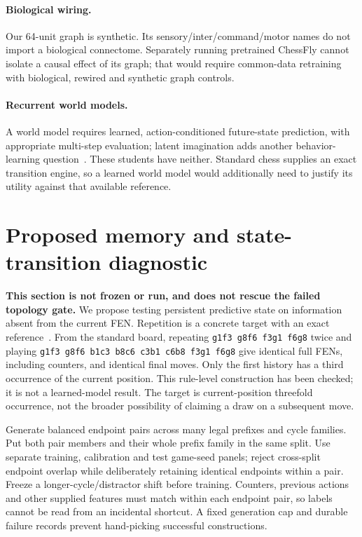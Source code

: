 \documentclass[10pt]{article}
\begin{document}
\paragraph{Biological wiring.}
Our 64-unit graph is synthetic. Its sensory/inter/command/motor names do not
import a biological connectome. Separately running pretrained ChessFly cannot
isolate a causal effect of its graph; that would require common-data retraining
with biological, rewired and synthetic graph controls.
\paragraph{Recurrent world models.}
A world model requires learned, action-conditioned future-state prediction,
with appropriate multi-step evaluation; latent imagination adds another
behavior-learning question~\cite{hafner2020}. These students have neither.
Standard chess supplies an exact transition engine, so a learned world model
would additionally need to justify its utility against that available reference.

\section{Proposed memory and state-transition diagnostic}
\textbf{This section is not frozen or run, and does not rescue the failed
topology gate.} We propose testing persistent predictive state on information
absent from the current FEN. Repetition is a concrete target with an exact
reference~\cite{pythonchess}. From the standard board, repeating
\texttt{g1f3 g8f6 f3g1 f6g8} twice and playing
\texttt{g1f3 g8f6 b1c3 b8c6 c3b1 c6b8 f3g1 f6g8}
give identical full FENs, including counters, and identical final moves.
Only the first history has a third occurrence of the current position.
This rule-level construction has been checked; it is not a learned-model result.
The target is current-position threefold occurrence, not the broader possibility
of claiming a draw on a subsequent move.

Generate balanced endpoint pairs across many legal prefixes and cycle families.
Put both pair members and their whole prefix family in the same split.
Use separate training, calibration and test game-seed panels; reject cross-split
endpoint overlap while deliberately retaining identical endpoints within a
pair. Freeze a longer-cycle/distractor shift before training. Counters, previous
actions and other supplied features must match within each endpoint pair, so
labels cannot be read from an incidental shortcut. A fixed generation cap and
durable failure records prevent hand-picking successful constructions.
\end{document}
